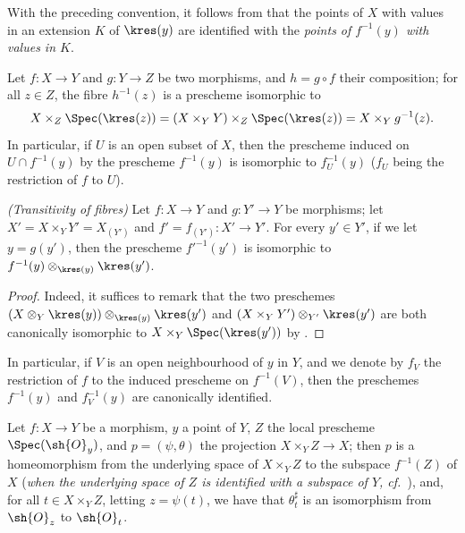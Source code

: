 With the preceding convention, it follows from  that the points of $X$ with values in an extension $K$ of $\kres(y)$ are identified with the \emph{points of $f^{-1}(y)$ with values in $K$}.

\begin{env}[3.6.3]
\label{I.3.6.3}
Let $f:X\to Y$ and $g:Y\to Z$ be two morphisms, and $h=g\circ f$ their composition; for all $z\in Z$, the fibre $h^{-1}(z)$ is a prescheme isomorphic to
\[
  X\times_Z\Spec(\kres(z))=(X\times_Y Y)\times_Z\Spec(\kres(z))=X\times_Y g^{-1}(z).
\]
In particular, if $U$ is an open subset of $X$, then the prescheme induced on $U\cap f^{-1}(y)$ by the prescheme $f^{-1}(y)$ is isomorphic to $f^{-1}_U(y)$ ($f_U$ being the restriction of $f$ to $U$).
\end{env}

\begin{proposition}[3.6.4]
\label{I.3.6.4}
\emph{(Transitivity of fibres)}
Let $f:X\to Y$ and $g:Y'\to Y$ be morphisms; let $X'=X\times_Y Y'=X_{(Y')}$ and $f'=f_{(Y')}:X'\to Y'$.
For every $y'\in Y'$, if we let $y=g(y')$, then the prescheme $f'^{-1}(y')$ is isomorphic to $f^{-1}(y)\otimes_{\kres(y)}\kres(y')$.
\end{proposition}

\begin{proof}
Indeed, it suffices to remark that the two preschemes $(X\otimes_Y\kres(y))\otimes_{\kres(y)}\kres(y')$ and $(X\times_Y Y')\otimes_{Y'}\kres(y')$ are both canonically isomorphic to $X\times_Y\Spec(\kres(y'))$ by .
\end{proof}

In particular, if $V$ is an open neighbourhood of $y$ in $Y$, and we denote by $f_V$ the restriction of $f$ to the induced prescheme on $f^{-1}(V)$, then the preschemes $f^{-1}(y)$ and $f^{-1}_V(y)$ are canonically identified.

\begin{proposition}[3.6.5]
\label{I.3.6.5}
Let $f:X\to Y$ be a morphism, $y$ a point of $Y$, $Z$ the local prescheme $\Spec(\sh{O}_y)$, and $p=(\psi,\theta)$ the projection $X\times_Y Z\to X$; then $p$ is a homeomorphism from the underlying space of $X\times_Y Z$ to the subspace $f^{-1}(Z)$ of $X$ (\emph{when the underlying space of $Z$ is identified with a subspace of $Y$, cf.~}), and, for all $t\in X\times_Y Z$, letting $z=\psi(t)$, we have that $\theta_t^\sharp$ is an isomorphism from $\sh{O}_z$ to $\sh{O}_t$.
\end{proposition}

